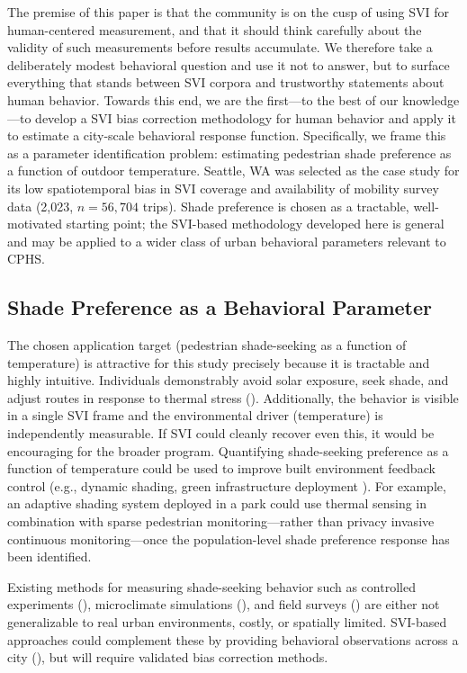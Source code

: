 \documentclass{ifacconf}
\begin{document}
The premise of this paper is that the community is on the cusp of using SVI for human-centered measurement, and that it should think carefully about the validity of such measurements before results accumulate.  We therefore take a deliberately modest behavioral question and use it not to answer, but to surface everything that stands between SVI corpora and trustworthy statements about human behavior. Towards this end, we are the first---to the best of our knowledge---to develop a SVI bias correction methodology for human behavior and apply it to estimate a city-scale behavioral response function. Specifically, we frame this as a parameter identification problem: estimating pedestrian shade preference as a function of outdoor temperature. Seattle, WA was selected as the case study for its low spatiotemporal bias in SVI coverage and availability of mobility survey data (2,023, $n=56,704$ trips). Shade preference is chosen as a tractable, well-motivated starting point; the SVI-based methodology developed here is general and may be applied to a wider class of urban behavioral parameters relevant to CPHS.

\sloppy
\subsection{Shade Preference as a Behavioral Parameter}
The chosen application target (pedestrian shade-seeking as a function of temperature) is attractive for this study precisely because it is tractable and highly intuitive. Individuals demonstrably avoid solar exposure, seek shade, and adjust routes in response to thermal stress (\cite{lee2020exploring,melnikov2022behavioural}). Additionally, the behavior is visible in a single SVI frame and the environmental driver (temperature) is independently measurable. If SVI could cleanly recover even this, it would be encouraging for the broader program. Quantifying shade-seeking preference as a function of temperature could be used to improve built environment feedback control (e.g., dynamic shading, green infrastructure deployment \cite{klemm2015street}). For example, an adaptive shading system deployed in a park could use thermal sensing in combination with sparse pedestrian monitoring---rather than privacy invasive continuous monitoring---once the population-level shade preference response has been identified.

Existing methods for measuring shade-seeking behavior such as controlled experiments (\cite{Zhao2023TheEO}), microclimate simulations (\cite{Ma2020PerformanceOD,Sedki2024OptimizingOT}), and field surveys (\cite{ma2023influence,dzyuban2022evidence}) are either not generalizable to real urban environments, costly, or spatially limited. SVI-based approaches could complement these by providing behavioral observations across a city (\cite{haddad2021using,elrod2025street}), but will require validated bias correction methods.
\end{document}
